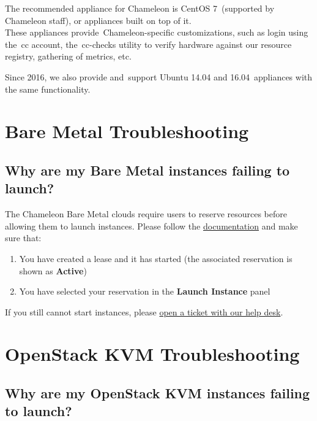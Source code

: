 The recommended appliance for Chameleon is CentOS 7~(supported by
Chameleon staff), or appliances built on top of it.\\
These appliances provide~Chameleon-specific customizations, such as
login using the~cc account, the~cc-checks utility to verify hardware
against our resource registry, gathering of metrics, etc.

Since 2016, we also provide and~support Ubuntu 14.04 and
16.04~appliances with the same functionality.

\section{Bare Metal
Troubleshooting}\label{bare-metal-troubleshooting}

\subsection{Why are my Bare Metal instances failing to
launch?}\label{why-are-my-bare-metal-instances-failing-to-launch}

The Chameleon Bare Metal clouds require users to reserve resources
before allowing them to launch instances. Please follow the
\href{https://www.chameleoncloud.org/docs/bare-metal/}{documentation}
and make sure that:

\begin{enumerate}
\tightlist
\item
  You have created a lease and it has started (the associated
  reservation is shown as \textbf{Active})
\item
  You have selected your reservation in the \textbf{Launch Instance}
  panel
\end{enumerate}

If you still cannot start instances, please
\href{https://www.chameleoncloud.org/user/help/}{open a ticket with our
help desk}.

\section{OpenStack KVM
Troubleshooting}\label{openstack-kvm-troubleshooting}

\subsection{Why are my OpenStack KVM instances failing to
launch?}\label{why-are-my-openstack-kvm-instances-failing-to-launch}

